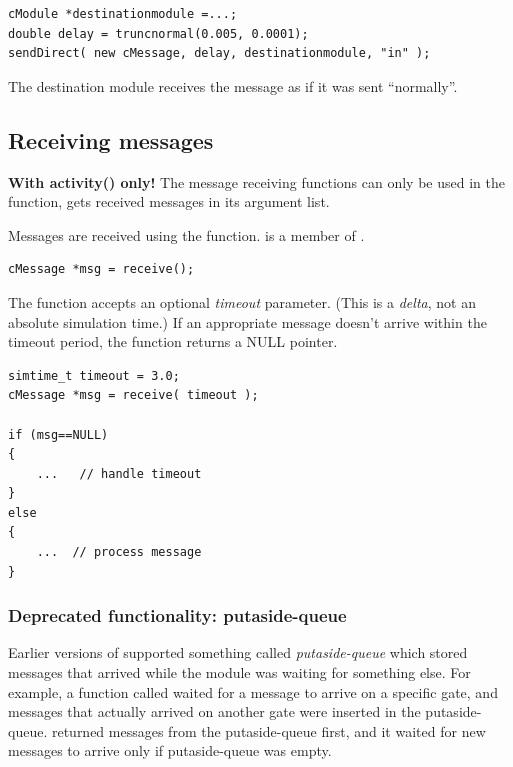 \begin{verbatim}
cModule *destinationmodule =...;
double delay = truncnormal(0.005, 0.0001);
sendDirect( new cMessage, delay, destinationmodule, "in" );
\end{verbatim}

The destination module receives the message as if it was sent
``normally''.



\subsection{Receiving messages}

\textbf{With activity() only!} The message receiving functions can
only be used in the  function,
 gets received messages in its argument list.

Messages are received using the  function.
 is a member of .

\begin{verbatim}
cMessage *msg = receive();
\end{verbatim}

The  function accepts an optional \textit{timeout}
parameter. (This is a \textit{delta}, not an
absolute simulation time.) If an appropriate message doesn't arrive
within the timeout period, the function returns a NULL pointer.

\begin{verbatim}
simtime_t timeout = 3.0;
cMessage *msg = receive( timeout );

if (msg==NULL)
{
    ...   // handle timeout
}
else
{
    ...  // process message
}
\end{verbatim}


\subsubsection{Deprecated functionality: putaside-queue}
\label{ch:simple-modules:putaside-queue}

Earlier versions of {\opp} supported something called \textit{putaside-queue}
which stored messages that arrived while the module was waiting for
something else. For example, a function called  waited
for a message to arrive on a specific gate, and messages that actually
arrived on another gate were inserted in the putaside-queue.
 returned messages from the putaside-queue first,
and it waited for new messages to arrive only if putaside-queue
was empty.

